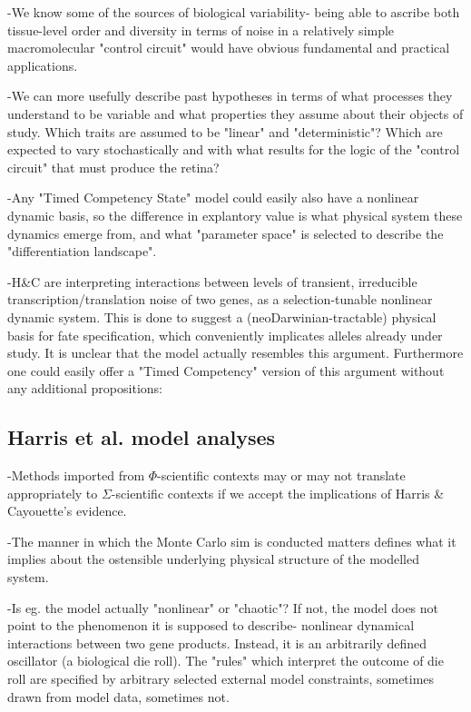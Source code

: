 -We know some of the sources of biological variability- being able to ascribe both tissue-level order and diversity in terms of noise in a relatively simple macromolecular "control circuit" would have obvious fundamental and practical applications.

-We can more usefully describe past hypotheses in terms of what processes they understand to be variable and what properties they assume about their objects of study. Which traits are assumed to be "linear" and "deterministic"? Which are expected to vary stochastically and with what results for the logic of the "control circuit" that must produce the retina? 

-Any "Timed Competency State" model could easily also have a nonlinear dynamic basis, so the difference in explantory value is what physical system these dynamics emerge from, and what "parameter space" is selected to describe the "differentiation landscape".

-H\&C are interpreting interactions between levels of transient, irreducible transcription/translation noise of two genes, as a selection-tunable nonlinear dynamic system. This is done to suggest a (neoDarwinian-tractable) physical basis for fate specification, which conveniently implicates alleles already under study. It is unclear that the model actually resembles this argument. Furthermore one could easily offer a "Timed Competency" version of this argument without any additional propositions:


\subsection{Harris et al. model analyses}

-Methods imported from $\Phi$-scientific contexts may or may not translate appropriately to $\Sigma$-scientific contexts if we accept the implications of Harris \& Cayouette's evidence. 

-The manner in which the Monte Carlo sim is conducted matters defines what it implies about the ostensible underlying physical structure of the modelled system.

-Is eg. the \cite{Boije2015} model actually "nonlinear" or "chaotic"? If not, the model does not point to the phenomenon it is supposed to describe- nonlinear dynamical interactions between two gene products. Instead, it is an arbitrarily defined oscillator (a biological die roll). The "rules" which interpret the outcome of die roll are specified by arbitrary selected external model constraints, sometimes drawn from model data, sometimes not.

